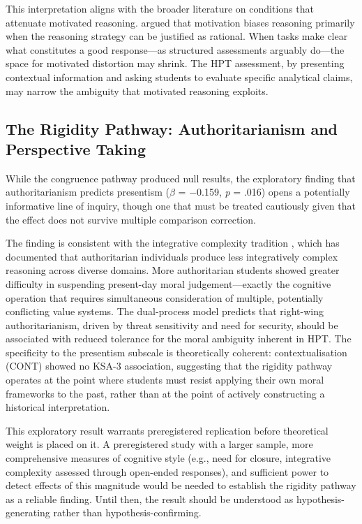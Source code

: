 \documentclass[referee,pdflatex,sn-apa]{sn-jnl}
\begin{document}
This interpretation aligns with the broader literature on conditions that attenuate motivated reasoning. \citet{Kunda1990} argued that motivation biases reasoning primarily when the reasoning strategy can be justified as rational. When tasks make clear what constitutes a good response---as structured assessments arguably do---the space for motivated distortion may shrink. The HPT assessment, by presenting contextual information and asking students to evaluate specific analytical claims, may narrow the ambiguity that motivated reasoning exploits.

\subsection{The Rigidity Pathway: Authoritarianism and Perspective Taking}\label{subsec:rigiditydiscussion}

While the congruence pathway produced null results, the exploratory finding that authoritarianism predicts presentism ($\beta$ = $-$0.159, \textit{p} = .016) opens a potentially informative line of inquiry, though one that must be treated cautiously given that the effect does not survive multiple comparison correction.

The finding is consistent with the integrative complexity tradition \citep{Suedfeld1977}, which has documented that authoritarian individuals produce less integratively complex reasoning across diverse domains. More authoritarian students showed greater difficulty in suspending present-day moral judgement---exactly the cognitive operation that requires simultaneous consideration of multiple, potentially conflicting value systems. The \citet{Duckitt2001} dual-process model predicts that right-wing authoritarianism, driven by threat sensitivity and need for security, should be associated with reduced tolerance for the moral ambiguity inherent in HPT. The specificity to the presentism subscale is theoretically coherent: contextualisation (CONT) showed no KSA-3 association, suggesting that the rigidity pathway operates at the point where students must resist applying their own moral frameworks to the past, rather than at the point of actively constructing a historical interpretation.

This exploratory result warrants preregistered replication before theoretical weight is placed on it. A preregistered study with a larger sample, more comprehensive measures of cognitive style (e.g., need for closure, integrative complexity assessed through open-ended responses), and sufficient power to detect effects of this magnitude would be needed to establish the rigidity pathway as a reliable finding. Until then, the result should be understood as hypothesis-generating rather than hypothesis-confirming.
\end{document}
